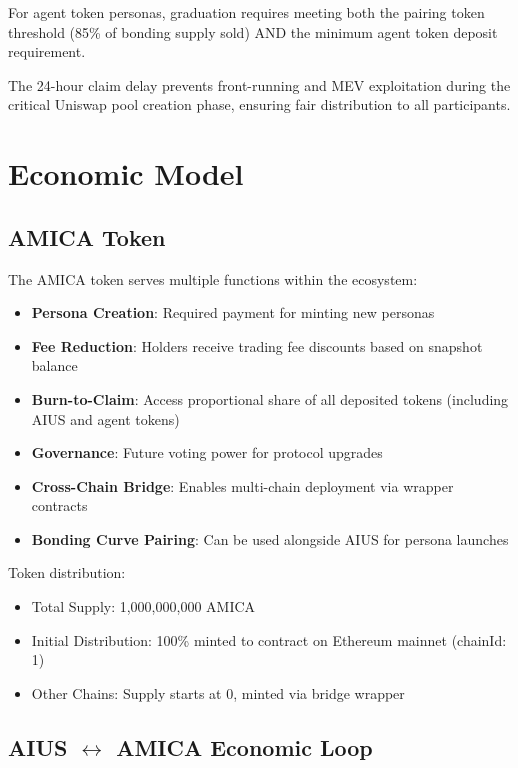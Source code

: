 \documentclass{article}
\begin{document}
For agent token personas, graduation requires meeting both the pairing token threshold (85\% of bonding supply sold) AND the minimum agent token deposit requirement.

The 24-hour claim delay prevents front-running and MEV exploitation during the critical Uniswap pool creation phase, ensuring fair distribution to all participants.

\section{Economic Model}

\subsection{AMICA Token}

The AMICA token serves multiple functions within the ecosystem:

\begin{itemize}
    \item \textbf{Persona Creation}: Required payment for minting new personas
    \item \textbf{Fee Reduction}: Holders receive trading fee discounts based on snapshot balance
    \item \textbf{Burn-to-Claim}: Access proportional share of all deposited tokens (including AIUS and agent tokens)
    \item \textbf{Governance}: Future voting power for protocol upgrades
    \item \textbf{Cross-Chain Bridge}: Enables multi-chain deployment via wrapper contracts
    \item \textbf{Bonding Curve Pairing}: Can be used alongside AIUS for persona launches
\end{itemize}

Token distribution:
\begin{itemize}
    \item Total Supply: 1,000,000,000 AMICA
    \item Initial Distribution: 100\% minted to contract on Ethereum mainnet (chainId: 1)
    \item Other Chains: Supply starts at 0, minted via bridge wrapper
\end{itemize}

\subsection{AIUS $\leftrightarrow$ AMICA Economic Loop}
\end{document}

